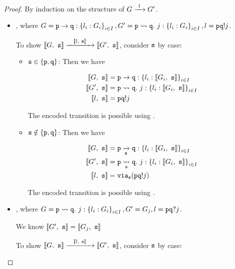 \begin{proof}
By induction on the structure of $\treduce{G}{G'}{l}$.

\begin{itemize}

\item {},
where $G = \gcomm{p}{q}{l_i: G_i}{i \in I},
G' = \gtrans{p}{q}{j}{l_i: G_i}{i \in I},
l = \aout{p}{q}{j}$.

To show $\treducelong
{\enc{G}{s}}{\enc{G'}{s}}{\enc{l}{s}}$,
consider $\mrole{s}$ by case:

\begin{itemize}

\item $\mrole{s} \in \{ \mrole{p}, \mrole{q} \}$:
Then we have

\begin{align*}
\enc{G}{s} &= \gcomm{p}{q}{l_i: \enc{G_i}{s}}{i \in I} \\
\enc{G'}{s} &= \gtrans{p}{q}{j}{l_i: \enc{G_i}{s}}{i \in I} \\
\enc{l}{s} &= \aout{p}{q}{j} \\
\end{align*}

The encoded transition is possible using .

\item $\mrole{s} \notin \{ \mrole{p}, \mrole{q} \}$:
Then we have

\begin{align*}
\enc{G}{s} &= \groute{p}{q}{s}{l_i: \enc{G_i}{s}}{i \in I} \\
\enc{G'}{s} &= \gtransroute{p}{q}{s}{j}{l_i: \enc{G_i}{s}}{i \in I} \\
\enc{l}{s} &= \via{s}{\aout{p}{q}{j}} \\
\end{align*}

The encoded transition is possible using .

\end{itemize}

\item {},
where $G = \gtrans{p}{q}{j}{l_i: G_i}{i \in I},
G' = G_j,
l = \ain{p}{q}{j}$.

We know $\enc{G'}{s} = \enc{G_j}{s}$

To show $\treducelong
{\enc{G}{s}}{\enc{G'}{s}}{\enc{l}{s}}$,
consider $\mrole{s}$ by case:

\begin{itemize}


\end{itemize}
\end{itemize}
\end{proof}
